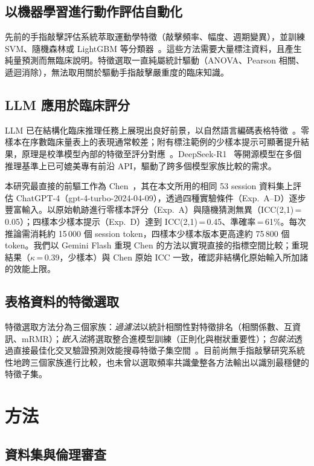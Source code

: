 \documentclass[12pt, a4paper]{article}
\begin{document}
\subsection{以機器學習進行動作評估自動化}
先前的手指敲擊評估系統萃取運動學特徵（敲擊頻率、幅度、週期變異），並訓練 SVM、隨機森林或 LightGBM 等分類器~\cite{cite_ml_motor,cite_ml_motor2,yang2024deep}。這些方法需要大量標注資料，且產生純量預測而無臨床說明。特徵選取一直純屬統計驅動（ANOVA、Pearson 相關、遞迴消除），無法取用關於驅動手指敲擊嚴重度的臨床知識。

\subsection{LLM 應用於臨床評分}
LLM 已在結構化臨床推理任務上展現出良好前景，以自然語言編碼表格特徵~\cite{cite_gpt4clinical}。零樣本在序數臨床量表上的表現通常較差；附有標注範例的少樣本提示可顯著提升結果，原理是校準模型內部的特徵至評分對應~\cite{cite_fewshot}。DeepSeek-R1~\cite{DeepSeek2025R1} 等開源模型在多個推理基準上已可媲美專有前沿 API，驅動了跨多個模型家族比較的需求。

本研究最直接的前驅工作為 Chen~\cite{chen2024chatgpt}，其在本文所用的相同 53 session 資料集上評估 ChatGPT-4（gpt-4-turbo-2024-04-09），透過四種實驗條件（Exp.~A--D）逐步豐富輸入。以原始軌跡進行零樣本評分（Exp.~A）與隨機猜測無異（ICC(2,1)\,=\,0.05）；四樣本少樣本提示（Exp.~D）達到 ICC(2,1)\,=\,0.45、準確率\,=\,61\%。每次推論需消耗約 15\,000 個 session token，四樣本少樣本版本更高達約 75\,800 個 token。我們以 Gemini Flash 重現 Chen 的方法以實現直接的指標空間比較；重現結果（$\kappa$\,=\,0.39，少樣本）與 Chen 原始 ICC 一致，確認非結構化原始輸入所加諸的效能上限。

\subsection{表格資料的特徵選取}
特徵選取方法分為三個家族：\emph{過濾法}以統計相關性對特徵排名（相關係數、互資訊、mRMR）；\emph{嵌入法}將選取整合進模型訓練（正則化與樹狀重要性）；\emph{包裝法}透過直接最佳化交叉驗證預測效能搜尋特徵子集空間~\cite{tibshirani1996}。目前尚無手指敲擊研究系統性地跨三個家族進行比較，也未曾以選取頻率共識彙整各方法輸出以識別最穩健的特徵子集。

\section{方法}

\subsection{資料集與倫理審查}
\end{document}
